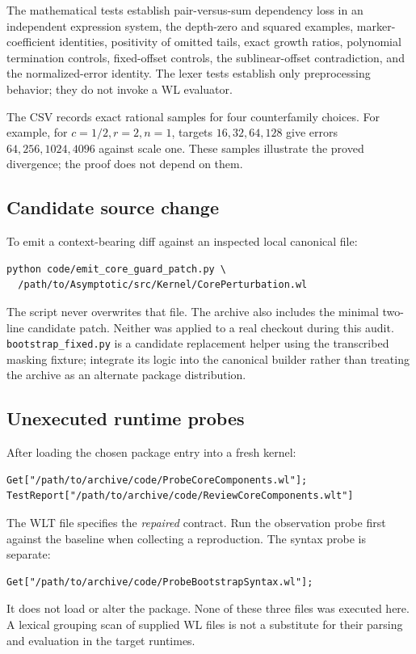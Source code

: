 \documentclass[11pt,letterpaper]{article}
\newcommand{\code}[1]{\nolinkurl{#1}}
\begin{document}
The mathematical tests establish pair-versus-sum dependency loss in an independent expression system, the depth-zero and squared examples, marker-coefficient identities, positivity of omitted tails, exact growth ratios, polynomial termination controls, fixed-offset controls, the sublinear-offset contradiction, and the normalized-error identity. The lexer tests establish only preprocessing behavior; they do not invoke a WL evaluator.

The CSV records exact rational samples for four counterfamily choices. For example, for \(c=1/2,r=2,n=1\), targets \(16,32,64,128\) give errors \(64,256,1024,4096\) against scale one. These samples illustrate the proved divergence; the proof does not depend on them.

\subsection{Candidate source change}
To emit a context-bearing diff against an inspected local canonical file:
\begin{lstlisting}
python code/emit_core_guard_patch.py \
  /path/to/Asymptotic/src/Kernel/CorePerturbation.wl
\end{lstlisting}
The script never overwrites that file. The archive also includes the minimal two-line candidate patch. Neither was applied to a real checkout during this audit. \code{bootstrap_fixed.py} is a candidate replacement helper using the transcribed masking fixture; integrate its logic into the canonical builder rather than treating the archive as an alternate package distribution.

\subsection{Unexecuted runtime probes}
After loading the chosen package entry into a fresh kernel:
\begin{lstlisting}
Get["/path/to/archive/code/ProbeCoreComponents.wl"];
TestReport["/path/to/archive/code/ReviewCoreComponents.wlt"]
\end{lstlisting}
The WLT file specifies the \emph{repaired} contract. Run the observation probe first against the baseline when collecting a reproduction. The syntax probe is separate:
\begin{lstlisting}
Get["/path/to/archive/code/ProbeBootstrapSyntax.wl"];
\end{lstlisting}
It does not load or alter the package. None of these three files was executed here. A lexical grouping scan of supplied WL files is not a substitute for their parsing and evaluation in the target runtimes.
\end{document}
